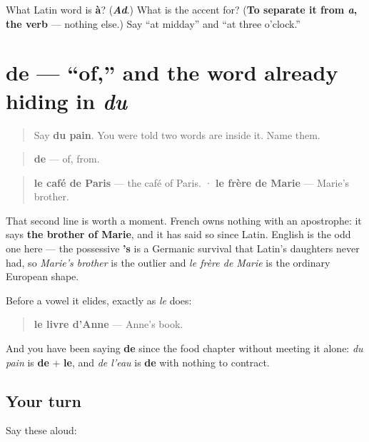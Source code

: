 \begin{tcolorbox}[breakable,colback=teal!4,colframe=teal!35!black,title={Before you move on}]
What Latin word is \textbf{à}? (\emph{\textbf{Ad}}.) What is the accent for? (\textbf{To separate it from \emph{a}, the verb} — nothing else.) Say \textquotedblleft{}at midday\textquotedblright{} and \textquotedblleft{}at three o'clock.\textquotedblright{}
\end{tcolorbox}
\section[de]{de — \textquotedblleft{}of,\textquotedblright{} and the word already hiding in \emph{du}}

\label{lesson:FR-C35-de}



\begin{quote}
Say \textbf{du pain}. You were told two words are inside it. Name them.
\end{quote}

\begin{cousinweb}
\begin{quote}
\textbf{de} — of, from.
\end{quote}

\begin{quote}
\textbf{le café de Paris} — the café of Paris. · \textbf{le frère de Marie} — Marie's brother.
\end{quote}

That second line is worth a moment. French owns nothing with an apostrophe: it says \textbf{the brother of Marie}, and it has said so since Latin. English is the odd one here — the possessive \textbf{'s} is a Germanic survival that Latin's daughters never had, so \emph{Marie's brother} is the outlier and \emph{le frère de Marie} is the ordinary European shape.

Before a vowel it elides, exactly as \emph{le} does:

\begin{quote}
\textbf{le livre d'Anne} — Anne's book.
\end{quote}

And you have been saying \textbf{de} since the food chapter without meeting it alone: \emph{du pain} is \textbf{de} + \textbf{le}, and \emph{de l'eau} is \textbf{de} with nothing to contract.
\end{cousinweb}

\subsection*{Your turn}
Say these aloud:

